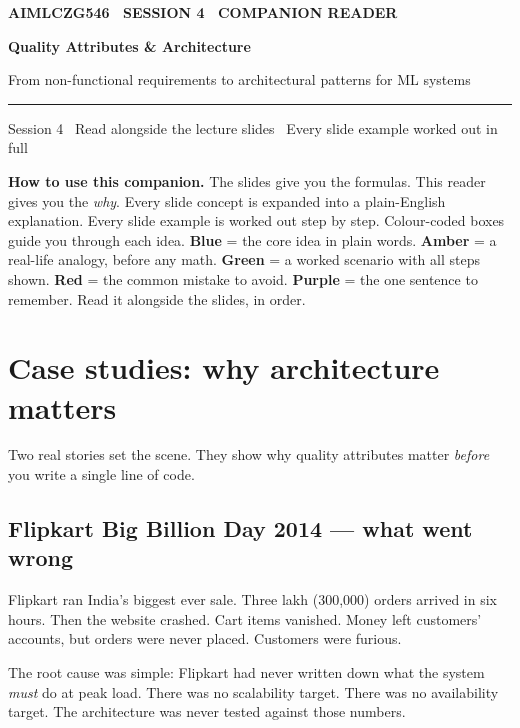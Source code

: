\documentclass[a4paper,11pt]{article}
\providecommand{\addfontfeatureslike}[1]{#1}
\newcommand{\titlebanner}[4]{%
  \begin{tcolorbox}[
    enhanced, breakable=false,
    colback=navy, colframe=navy,
    boxrule=0pt, arc=3pt, outer arc=3pt,
    left=16pt, right=16pt, top=16pt, bottom=16pt,
    before skip=2pt, after skip=14pt,
    width=\linewidth ]
    {\sffamily\footnotesize\bfseries\color{white!85}%
      \MakeUppercase{\addfontfeatureslike{#1}}}\par
    \vspace{6pt}
    {\sffamily\bfseries\fontsize{30}{34}\selectfont\color{white} #2\par}
    \vspace{5pt}
    {\sffamily\large\color{white!88} #3\par}
    \vspace{9pt}
    {\color{white!55}\rule{\linewidth}{0.4pt}}\par
    \vspace{6pt}
    {\sffamily\footnotesize\color{white!82} #4\par}
  \end{tcolorbox}%
}
\begin{document}

\thispagestyle{fancy}

\titlebanner
  {AIMLCZG546 \textperiodcentered\ Session 4 \textperiodcentered\ Companion Reader}
  {Quality Attributes \& Architecture}
  {From non-functional requirements to architectural patterns for ML systems}
  {Session 4 \textperiodcentered\ Read alongside the lecture slides \textperiodcentered\ Every slide example worked out in full}

\noindent\textbf{How to use this companion.}
The slides give you the formulas. This reader gives you the \emph{why}.
Every slide concept is expanded into a plain-English explanation.
Every slide example is worked out step by step.
Colour-coded boxes guide you through each idea.
\textcolor{intuFrame}{\textbf{Blue}} = the core idea in plain words.
\textcolor{everyFrame}{\textbf{Amber}} = a real-life analogy, before any math.
\textcolor{workFrame}{\textbf{Green}} = a worked scenario with all steps shown.
\textcolor{watchFrame}{\textbf{Red}} = the common mistake to avoid.
\textcolor{keyFrame}{\textbf{Purple}} = the one sentence to remember.
Read it alongside the slides, in order.

\medskip

\section{Case studies: why architecture matters}

Two real stories set the scene. They show why quality attributes matter
\emph{before} you write a single line of code.

\subsection{Flipkart Big Billion Day 2014 — what went wrong}

Flipkart ran India's biggest ever sale. Three lakh (300{,}000) orders arrived
in six hours. Then the website crashed. Cart items vanished. Money left
customers' accounts, but orders were never placed. Customers were furious.

The root cause was simple: Flipkart had never written down what the system
\emph{must} do at peak load. There was no scalability target. There was no
availability target. The architecture was never tested against those numbers.
\end{document}
